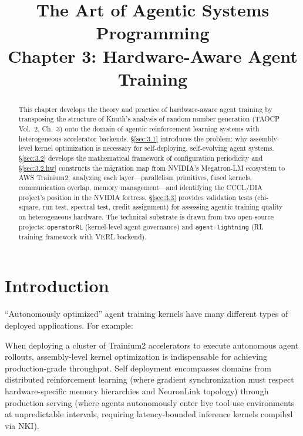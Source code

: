 \documentclass[12pt]{article}
\title{\textbf{The Art of Agentic Systems Programming} \\ \large Chapter 3: Hardware-Aware Agent Training}
\begin{document}
\maketitle

\begin{abstract}
This chapter develops the theory and practice of hardware-aware agent training by transposing the structure of Knuth's analysis of random number generation (TAOCP Vol.~2, Ch.~3) onto the domain of agentic reinforcement learning systems with heterogeneous accelerator backends. \S\ref{sec:3.1} introduces the problem: why assembly-level kernel optimization is necessary for self-deploying, self-evolving agent systems. \S\ref{sec:3.2} develops the mathematical framework of configuration periodicity and \S\ref{sec:3.2.hw} constructs the migration map from NVIDIA's Megatron-LM ecosystem to AWS Trainium2, analyzing each layer---parallelism primitives, fused kernels, communication overlap, memory management---and identifying the CCCL/DIA project's position in the NVIDIA fortress. \S\ref{sec:3.3} provides validation tests (chi-square, run test, spectral test, credit assignment) for assessing agentic training quality on heterogeneous hardware. The technical substrate is drawn from two open-source projects: \texttt{operatorRL} (kernel-level agent governance) and \texttt{agent-lightning} (RL training framework with VERL backend).
\end{abstract}


\section{Introduction}
\label{sec:3.1}

``Autonomously optimized'' agent training kernels have many different types of deployed applications. For example:

\medskip

\noindent When deploying a cluster of Trainium2 accelerators to execute autonomous agent rollouts, assembly-level kernel optimization is indispensable for achieving production-grade throughput. Self deployment encompasses domains from distributed reinforcement learning (where gradient synchronization must respect hardware-specific memory hierarchies and NeuronLink topology) through production serving (where agents autonomously enter live tool-use environments at unpredictable intervals, requiring latency-bounded inference kernels compiled via NKI).
\end{document}

